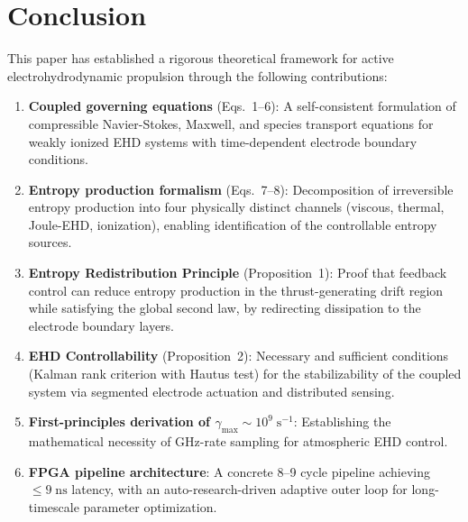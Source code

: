 \documentclass[12pt,twocolumn]{article}
\begin{document}
\section{Conclusion}
\label{sec:conclusion}

This paper has established a rigorous theoretical framework for
active electrohydrodynamic propulsion through the following
contributions:

\begin{enumerate}
  \item \textbf{Coupled governing equations} (Eqs.~1--6):
    A self-consistent formulation of compressible Navier-Stokes,
    Maxwell, and species transport equations for weakly ionized
    EHD systems with time-dependent electrode boundary conditions.

  \item \textbf{Entropy production formalism} (Eqs.~7--8):
    Decomposition of irreversible entropy production into four
    physically distinct channels (viscous, thermal, Joule-EHD,
    ionization), enabling identification of the controllable
    entropy sources.

  \item \textbf{Entropy Redistribution Principle} (Proposition~1):
    Proof that feedback control can reduce entropy production in the
    thrust-generating drift region while satisfying the global second
    law, by redirecting dissipation to the electrode boundary layers.

  \item \textbf{EHD Controllability} (Proposition~2):
    Necessary and sufficient conditions (Kalman rank criterion with
    Hautus test) for the stabilizability of the coupled system via
    segmented electrode actuation and distributed sensing.

  \item \textbf{First-principles derivation of
    $\gamma_{\max} \sim 10^9\;\mathrm{s^{-1}}$}:
    Establishing the mathematical necessity of GHz-rate sampling for
    atmospheric EHD control.

  \item \textbf{FPGA pipeline architecture}:
    A concrete 8--9 cycle pipeline achieving $\leq 9\;\mathrm{ns}$
    latency, with an auto-research-driven adaptive outer loop for
    long-timescale parameter optimization.


\end{enumerate}
\end{document}

